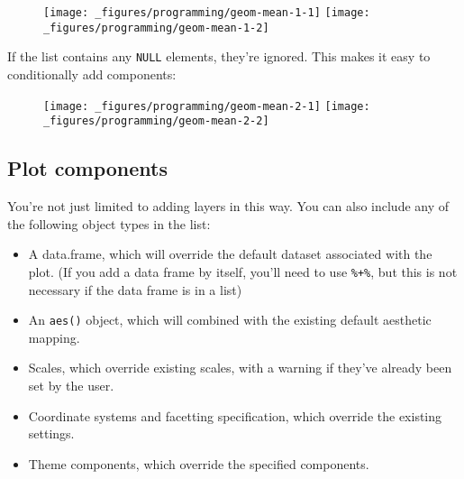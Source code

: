 \begin{figure}[H]
  \centering
  \texttt{[image: \_figures/programming/geom-mean-1-1]}%
  \texttt{[image: \_figures/programming/geom-mean-1-2]}
\end{figure}

If the list contains any \texttt{NULL} elements, they're ignored. This
makes it easy to conditionally add components:

\begin{Shaded}
\begin{Highlighting}[]
\StringTok{ } \NormalTok{) \{}
  \NormalTok{(}
    \NormalTok{(} \NormalTok{, } \NormalTok{, } \NormalTok{),}
      \NormalTok{(} \NormalTok{, } \NormalTok{, } \NormalTok{)}
  \NormalTok{)}
\NormalTok{\}}
\StringTok{ }\NormalTok{()}
\StringTok{ }\NormalTok{(} \NormalTok{)}
\end{Highlighting}
\end{Shaded}

\begin{figure}[H]
  \centering
  \texttt{[image: \_figures/programming/geom-mean-2-1]}%
  \texttt{[image: \_figures/programming/geom-mean-2-2]}
\end{figure}

\subsection{Plot components}

You're not just limited to adding layers in this way. You can also
include any of the following object types in the list:

\begin{itemize}
\item
  A data.frame, which will override the default dataset associated with
  the plot. (If you add a data frame by itself, you'll need to use
  \texttt{\%+\%}, but this is not necessary if the data frame is in a
  list)
\item
  An \texttt{aes()} object, which will combined with the existing
  default aesthetic mapping.
\item
  Scales, which override existing scales, with a warning if they've
  already been set by the user.
\item
  Coordinate systems and facetting specification, which override the
  existing settings.
\item
  Theme components, which override the specified components.
\end{itemize}

